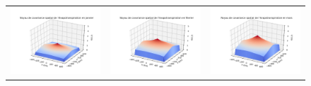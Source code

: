 \documentclass[a4paper,11pt]{article}
\numberwithin{equation}{section}
\begin{document}
\begin{figure}[H]
\begin{tabular}{ccc}
	\includegraphics[scale=0.34]{images/kernel_evap_m1.png} & \includegraphics[scale=0.34]{images/kernel_evap_m2.png} & \includegraphics[scale=0.34]{images/kernel_evap_m3.png} \\ 

\end{tabular}
\end{figure}
\end{document}
